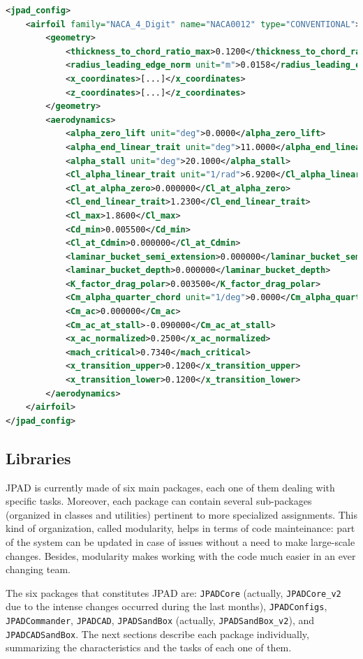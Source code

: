 \bigskip
\begin{lstlisting}[caption={Example of JPAD airfoil XML file}, captionpos=b, tabsize=2, language=XML, label={lst:AirfoilXML}]
<jpad_config>
    <airfoil family="NACA_4_Digit" name="NACA0012" type="CONVENTIONAL">
        <geometry>
            <thickness_to_chord_ratio_max>0.1200</thickness_to_chord_ratio_max>
            <radius_leading_edge_norm unit="m">0.0158</radius_leading_edge_norm>
            <x_coordinates>[...]</x_coordinates>
            <z_coordinates>[...]</z_coordinates>
        </geometry>
        <aerodynamics>
            <alpha_zero_lift unit="deg">0.0000</alpha_zero_lift>
            <alpha_end_linear_trait unit="deg">11.0000</alpha_end_linear_trait>
            <alpha_stall unit="deg">20.1000</alpha_stall>
            <Cl_alpha_linear_trait unit="1/rad">6.9200</Cl_alpha_linear_trait>
            <Cl_at_alpha_zero>0.000000</Cl_at_alpha_zero>
            <Cl_end_linear_trait>1.2300</Cl_end_linear_trait>
            <Cl_max>1.8600</Cl_max>
            <Cd_min>0.005500</Cd_min>
            <Cl_at_Cdmin>0.000000</Cl_at_Cdmin>
            <laminar_bucket_semi_extension>0.000000</laminar_bucket_semi_extension>
            <laminar_bucket_depth>0.000000</laminar_bucket_depth>
            <K_factor_drag_polar>0.003500</K_factor_drag_polar>
            <Cm_alpha_quarter_chord unit="1/deg">0.0000</Cm_alpha_quarter_chord>
            <Cm_ac>0.000000</Cm_ac>
            <Cm_ac_at_stall>-0.090000</Cm_ac_at_stall>
            <x_ac_normalized>0.2500</x_ac_normalized>
            <mach_critical>0.7340</mach_critical>
            <x_transition_upper>0.1200</x_transition_upper>
            <x_transition_lower>0.1200</x_transition_lower>
        </aerodynamics>
    </airfoil>
</jpad_config>
\end{lstlisting}

\subsection{Libraries}
\gls{JPAD} is currently made of six main packages, each one of them dealing with specific tasks. Moreover, each package can contain several sub-packages (organized in classes and utilities) pertinent to more specialized assignments. This kind of organization, called modularity, helps in terms of code mainteinance: part of the system can be updated in case of issues without a need to make large-scale changes. Besides, modularity makes working with the code much easier in an ever changing team.

\bigskip
\noindent
The six packages that constitutes \gls{JPAD} are: \lstinline[language=Java]!JPADCore! (actually, \lstinline[language=Java]!JPADCore_v2! due to the intense changes occurred during the last months), \lstinline[language=Java]!JPADConfigs!, \lstinline[language=Java]!JPADCommander!, \lstinline[language=Java]!JPADCAD!, \lstinline[language=Java]!JPADSandBox! (actually, \lstinline[language=Java]!JPADSandBox_v2!), and \lstinline[language=Java]!JPADCADSandBox!. The next sections describe each package individually, summarizing the characteristics and the tasks of each one of them.

